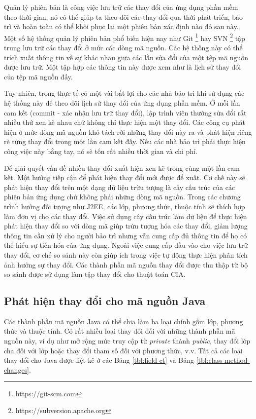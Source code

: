 \documentclass[12pt]{report}
\begin{document}
Quản lý phiên bản là công việc lưu trữ các thay đổi của ứng dụng phần mềm theo thời gian, nó có thể giúp ta theo dõi các thay đổi qua thời phát triển, bảo trì và hoàn toàn có thể khôi phục lại một phiên bản xác định nào đó sau này. Một số hệ thống quản lý phiên bản phổ biến hiện nay như Git \footnote{https://git-scm.com} hay SVN  \footnote{https://subversion.apache.org} tập trung lưu trữ các thay đổi ở mức các dòng mã nguồn. Các hệ thống này có thể trích xuất thông tin về sự khác nhau giữa các lần sửa đổi của một tệp mã nguồn được lưu trữ. Một tập hợp các thông tin này được xem như là lịch sử thay đổi của tệp mã nguồn đấy.

Tuy nhiên, trong thực tế có một vài bất lợi cho các nhà bảo trì khi sử dụng các hệ thống này để theo dõi lịch sử thay đổi của ứng dụng phần mềm. Ở mỗi lần cam kết (commit - xác nhận lưu trữ thay đổi), lập trình viên thường sửa đổi rất nhiều thứ xen kẽ nhau chứ không chỉ thực hiện một thay đổi. Các công cụ phát hiện ở mức dòng mã nguồn khó tách rời những thay đổi này ra và phát hiện riêng rẽ từng thay đổi trong một lần cam kết đấy. Nếu các nhà bảo trì phải thực hiện công việc này bằng tay, nó sẽ tốn rất nhiều thời gian và chi phí.

Để giải quyết vấn đề nhiều thay đổi xuất hiện xen kẽ trong cùng một lần cam kết. Một hướng tiếp cận để phát hiện thay đổi mới được để xuất. Cơ chế này sẽ phát hiện thay đổi trên một dạng dữ liệu trừu tượng là cây cấu trúc của các phiên bản ứng dụng chứ không phải những dòng mã nguồn. Trong các chương trình hướng đối tượng như J2EE, các lớp, phương thức, thuộc tính sẽ thích hợp làm đơn vị cho các thay đổi. Việc sử dụng cây cấu trúc làm dữ liệu để thực hiện phát hiện thay đổi so với dòng mã giúp trừu tượng hóa các thay đổi, giảm lượng thông tin cần xử lý cho người bảo trì nhưng vẫn cung cấp đủ thông tin để họ có thể hiểu sự tiến hóa của ứng dụng. Ngoài việc cung cấp đầu vào cho việc lưu trữ thay đổi, cơ chế so sánh này còn giúp ích trong việc tự động thực hiện phân tích ảnh hưởng sự thay đổi. Các thành phần mã nguồn thay đổi được thu thập từ bộ so sánh được sử dụng làm tập thay đổi cho thuật toán CIA.

\subsection{Phát hiện thay đổi cho mã nguồn Java}
Các thành phần mã nguồn Java có thể chia làm ba loại chính gồm lớp, phương thức và thuộc tính. Có rất nhiều loại thay đổi đối với những thành phần mã nguồn này, ví dụ như mở rộng mức truy cập từ \textit{private} thành \textit{public}, thay đổi lớp cha đối với lớp hoặc thay đổi tham số đối với phương thức, v.v. Tất cả các loại thay đổi cho Java được liệt kê ở các Bảng \ref{tbl:field-ct} và Bảng \ref{tbl:class-method-changes}.
\end{document}

